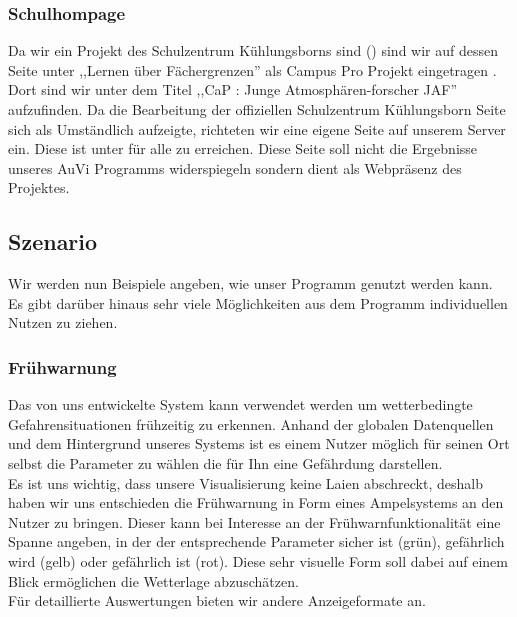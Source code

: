 \subsubsection{Schulhompage} %
Da wir ein Projekt des Schulzentrum Kühlungsborns sind () sind wir auf dessen Seite unter ,,Lernen über Fächergrenzen'' als Campus Pro Projekt eingetragen \cite{szkb}.
Dort sind wir unter dem Titel ,,CaP \jf : Junge Atmosphären-forscher JAF'' aufzufinden.
Da die Bearbeitung der offiziellen Schulzentrum Kühlungsborn Seite sich als Umständlich aufzeigte,
richteten wir eine eigene Seite auf unserem Server ein.
Diese ist unter 
für alle zu erreichen.
Diese Seite soll nicht die Ergebnisse unseres AuVi Programms widerspiegeln sondern dient als Webpräsenz des Projektes.

\subsection{Szenario} %
Wir werden nun Beispiele angeben, wie unser Programm genutzt werden kann.
Es gibt darüber hinaus sehr viele Möglichkeiten aus dem Programm individuellen Nutzen zu ziehen.

\subsubsection{Frühwarnung} %
Das von uns entwickelte System kann verwendet werden um wetterbedingte Gefahrensituationen frühzeitig zu erkennen.
Anhand der globalen Datenquellen und dem Hintergrund unseres Systems ist es einem Nutzer möglich für seinen Ort selbst die Parameter zu wählen die für Ihn eine Gefährdung darstellen.\\
Es ist uns wichtig, dass unsere Visualisierung keine Laien abschreckt,
deshalb haben wir uns entschieden die Frühwarnung in Form eines Ampelsystems an den Nutzer zu bringen.
Dieser kann bei Interesse an der Frühwarnfunktionalität eine Spanne angeben,
in der der entsprechende Parameter sicher ist (grün), gefährlich wird (gelb) oder gefährlich ist (rot).
Diese sehr visuelle Form soll dabei auf einem Blick ermöglichen die Wetterlage abzuschätzen.\\
Für detaillierte Auswertungen bieten wir andere Anzeigeformate an.

